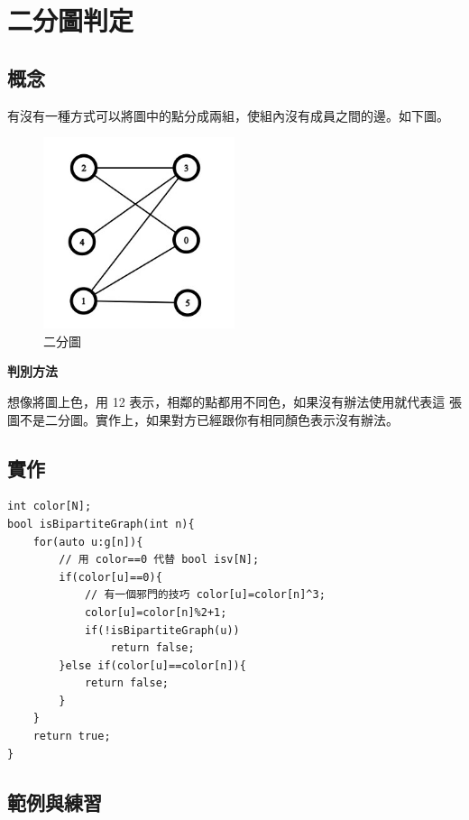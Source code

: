 \section{二分圖判定}
    \subsection{概念}
    有沒有一種方式可以將圖中的點分成兩組，使組內沒有成員之間的邊。如下圖。

    \begin{figure}[ht]
        \centering
        \includegraphics[width=0.5\textwidth]{../Images/Graph3.jpg}
        \caption{二分圖}
    \end{figure}

    \textbf{判別方法}

    想像將圖上色，用 12 表示，相鄰的點都用不同色，如果沒有辦法使用就代表這
    張圖不是二分圖。實作上，如果對方已經跟你有相同顏色表示沒有辦法。

    \subsection{實作}

\begin{lstlisting}[caption=二分圖判定]
int color[N];
bool isBipartiteGraph(int n){
    for(auto u:g[n]){
        // 用 color==0 代替 bool isv[N];
        if(color[u]==0){
            // 有一個邪門的技巧 color[u]=color[n]^3;
            color[u]=color[n]%2+1;
            if(!isBipartiteGraph(u))
                return false;
        }else if(color[u]==color[n]){
            return false;
        }
    }
    return true;
}
\end{lstlisting}

    \subsection{範例與練習}

